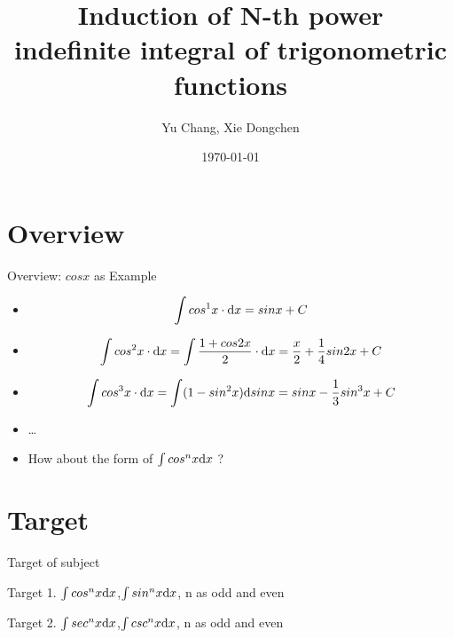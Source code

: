 \documentclass[11pt, thmnum, eqsecnum, allcites, dark]{mathbeamer}
\title[\sc Trigonometric \& Integration]{\sc Induction of N-th power \\ indefinite integral of trigonometric functions}
\author{Yu Chang, Xie Dongchen}
\date{\today}
\institute[UESTC]{Software Engineering, UESTC}
\begin{document}
\section{Overview}
\begin{frame}{Overview: $cosx$ as Example}
\begin{itemize}[<+->]
\item $$\int cos^1x \cdot {\rm d}x = sinx + C$$
\item $$\int cos^2x \cdot{\rm d}x = \int \frac{1 + cos2x}{2}\cdot {\rm d}x = \frac{x}{2} + \frac{1}{4}sin2x + C$$
\item $$\int cos^3x \cdot{\rm d}x = \int (1 - sin^2x) {\rm d}sinx = sinx - \frac{1}{3}sin^3x + C$$
\item \qquad \qquad \qquad \qquad \qquad \qquad \qquad \ldots
\item   \qquad How about the form of $\int cos^nx {\rm d}x$ ?
\end{itemize}
\end{frame}

\section{Target}
\begin{frame}{Target of subject}
\begin{block}{Target 1.}
    $\int cos^nx {\rm d}x$,$\int sin^nx {\rm d}x$, n as odd and even
  \end{block}
  \begin{block}{Target 2.}
    $\int sec^nx {\rm d}x$,$\int csc^nx {\rm d}x$, n as odd and even
  \end{block}
\end{frame}
\end{document}
